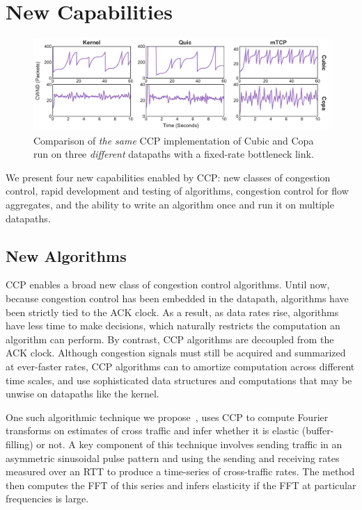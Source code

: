 \section{New Capabilities}
\label{s:capabilities}
 \begin{figure}[t!]
 \centering
     \includegraphics[width=2\columnwidth]{img/datapath-compare.pdf}
     \caption{Comparison of \textit{the same} CCP implementation of Cubic and Copa run on three \textit{different} datapaths with a fixed-rate bottleneck link. %
     }\label{fig:datapaths:wora}
 \end{figure}


We present four new capabilities enabled by CCP: new classes of congestion control, rapid development and testing of algorithms, congestion control for flow aggregates, and the ability to write an algorithm once and run it on multiple datapaths.

\subsection{New Algorithms}
\label{s:capabilities:algs}

CCP enables a broad new class of congestion control algorithms.
Until now, because congestion control has been embedded in the datapath,
algorithms have been strictly tied to the ACK clock.
As a result, as data rates rise, algorithms have less time to make decisions,
which naturally restricts the computation an algorithm can perform.
By contrast, CCP algorithms are decoupled from the ACK clock.
Although congestion signals must still be acquired and summarized at ever-faster rates, CCP algorithms can to amortize computation across different time scales, and use sophisticated data structures and computations that may be unwise on datapaths like the kernel.

One such algorithmic technique we propose~\cite{nimbus}, uses CCP to compute Fourier transforms on estimates of cross traffic and infer whether it is elastic (buffer-filling) or not.
A key component of this technique involves sending traffic in an asymmetric sinusoidal pulse pattern and using the sending and receiving rates measured over an RTT to produce a time-series of cross-traffic rates. The method then computes the FFT of this series and infers elasticity if the FFT at particular frequencies is large.

